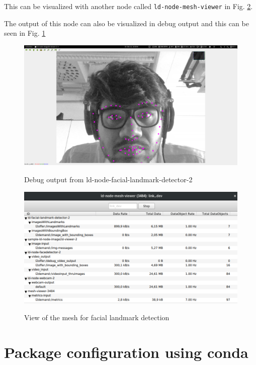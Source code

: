 \documentclass[a4paper, 12pt, oneside]{report}
\begin{document}
  \noindent This can be visualized with another node called \texttt{ld-node-mesh-viewer} in Fig. \ref{fig:mesh_landmark}. 

  \noindent The output of this node can also be visualized in debug output and this can be seen in Fig. \ref{fig:landmarkouput}
  
  \begin{figure}[h]
      \caption{Debug output from ld-node-facial-landmark-detector-2}
      \centering
      \includegraphics[width=1\textwidth]{faciallandmarkoutput}
      \label{fig:landmarkouput}
  \end{figure}

  \begin{figure}[h]
    \caption{View of the mesh for facial landmark detection}
    \centering
    \includegraphics[width=1\textwidth]{mesh_viewer_on_sample_configuration}
    \label{fig:mesh_landmark}
  \end{figure}
   
  \newpage
  
  \chapter{Package configuration using conda}
\end{document}
